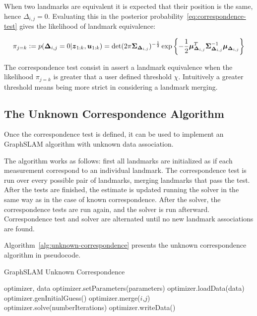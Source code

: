 
When two landmarks are equivalent it is expected that their position is the same, hence $\Delta_{i,j}=0$. Evaluating this in the posterior probability~\eqref{eq:correspondence-test} gives the likelihood of landmark equivalence:

\begin{equation}
\pi_{j=k} \vcentcolon=
p(\boldsymbol{\Delta}_{i,j}=0|\boldsymbol{z}_{1:k},\boldsymbol{u}_{1:k})=
\det(2\pi\boldsymbol{\Sigma}_{\boldsymbol{\Delta}_{i,j}})^{-\frac{1}{2}}
\exp\left\lbrace-\frac{1}{2}\boldsymbol{\mu}_{\boldsymbol{\Delta}_{i,j}}^T\boldsymbol{\Sigma}_{\boldsymbol{\Delta}_{i,j}}^{-1}\boldsymbol{\mu}_{\boldsymbol{\Delta}_{i,j}}\right\rbrace
\label{eq:landmark-equivalence}
\end{equation}

The correspondence test consist in assert a landmark equivalence when the likelihood $\pi_{j=k}$ is greater that a user defined threshold $\chi$. Intuitively a greater threshold means being more strict in considering a landmark merging.

\subsection{The Unknown Correspondence Algorithm}

Once the correspondence test is defined, it can be used to implement an GraphSLAM algorithm with unknown data association. 

The algorithm works as follows: first all landmarks are initialized as if each measurement correspond to an individual landmark. The correspondence test is run over every possible pair of landmarks, merging landmarks that pass the test. After the tests are finished, the estimate is updated running the solver in the same way as in the case of known correspondence. After the solver, the correspondence tests are run again, and the solver is run afterward. Correspondence test and solver are alternated until no new landmark associations are found. 

Algorithm~\ref{alg:unknown-correspondence} presents the unknown correspondence algorithm in pseudocode. 

\begin{algorithm}[htbp!]
    \caption{GraphSLAM Unknown Correspondence}
    \label{alg:unknown-correspondence}
    \begin{algorithmic}[1]
        \Require optimizer, data
        \State optimizer.setParameters(parameters)
        \State optimizer.loadData(data)
        \State optimizer.genInitialGuess()
        \State
                    \State optimizer.merge($i$,$j$) 
                \EndIf 
            \EndFor
            \State optimizer.solve(numberIterations)
        \EndWhile
        \State
        \State optimizer.writeData()
    \end{algorithmic}
\end{algorithm}

